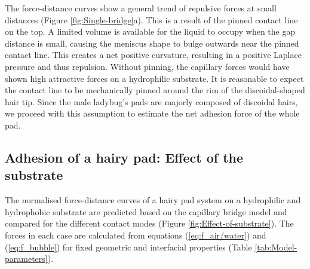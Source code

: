 \documentclass[vruler,JEB]{COB}%
\begin{document}
%
%

The force-distance curves show a general trend of repulsive forces
at small distances (Figure \ref{fig:Single-bridge}a). This is a result
of the pinned contact line on the top. A limited volume is available
for the liquid to occupy when the gap distance is small, causing the
meniscus shape to bulge outwards near the pinned contact line. This
creates a net positive curvature, resulting in a positive Laplace
pressure and thus repulsion. Without pinning, the capillary forces
would have shown high attractive forces on a hydrophilic substrate\citep{RN93}. 
It is reasonable to expect the contact line to be mechanically pinned around the rim of the discoidal-shaped hair tip.
Since the male ladybug's pads are majorly composed of discoidal hairs, we proceed with this assumption to estimate the net adhesion
force of the whole pad.
\subsection{Adhesion of a hairy pad: Effect of the substrate\label{subsec:Capillary-Bridge-Model:}}

The normalised force-distance curves of a hairy pad system on a hydrophilic
and hydrophobic substrate are predicted based on the capillary bridge
model and compared for the different contact modes (Figure \ref{fig:Effect-of-substrate}).
The forces in each case are calculated from equations (\ref{eq:f_air/water})
and (\ref{eq:f_bubble}) for fixed geometric and interfacial properties
(Table \ref{tab:Model-parameters}). 
\end{document}
